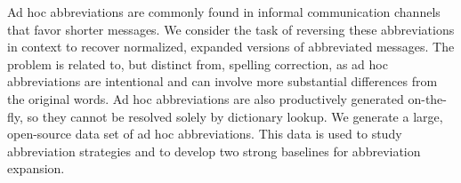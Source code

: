 Ad hoc abbreviations are commonly found in informal communication channels that favor shorter messages. We consider the task of reversing these abbreviations in context to recover normalized, expanded versions of abbreviated messages. The problem is related to, but distinct from, spelling correction, as ad hoc abbreviations are intentional and can involve more substantial differences from the original words. Ad hoc abbreviations are also productively generated on-the-fly, so they cannot be resolved solely by dictionary lookup. We generate a large, open-source data set of ad hoc abbreviations. This data is used to study abbreviation strategies and to develop two strong baselines for abbreviation expansion.
